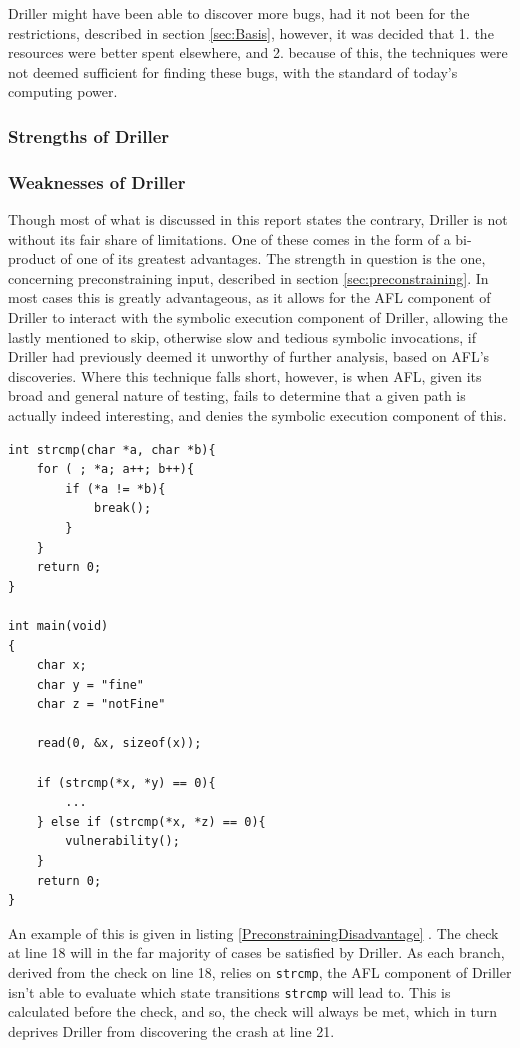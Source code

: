 \documentclass[a4paper]{article}
\newcommand{\ttt}[1]{\texttt{#1}}
\begin{document}
Driller might have been able to discover more bugs, had it not been for the restrictions, described in section \ref{sec:Basis}, however, it was decided that 1. the resources were better spent elsewhere, and 2. because of this, the techniques were not deemed sufficient for finding these bugs, with the standard of today's computing power.
\subsubsection{Strengths of Driller}
\label{sec:DrillerStrengths}

\subsubsection{Weaknesses of Driller}
\label{sec:Driller Weaknesses}
Though most of what is discussed in this report states the contrary, Driller is not without its fair share of limitations. One of these comes in the form of a bi-product of one of its greatest advantages. The strength in question is the one, concerning preconstraining input, described in section \ref{sec:preconstraining}. In most cases this is greatly advantageous, as it allows for the AFL component of Driller to interact with the symbolic execution component of Driller, allowing the lastly mentioned to skip, otherwise slow and tedious symbolic invocations, if Driller had previously deemed it unworthy of further analysis, based on AFL's discoveries. Where this technique falls short, however, is when AFL, given its broad and general nature of testing, fails to determine that a given path is actually indeed interesting, and denies the symbolic execution component of this.
\begin{lstlisting}[caption=An example of preconstraining being a disadvantage,
label=PreconstrainingDisadvantage, captionpos=b]
int strcmp(char *a, char *b){
    for ( ; *a; a++; b++){
        if (*a != *b){
            break();
        }
    }
    return 0;
}

int main(void)
{
    char x;
    char y = "fine"
    char z = "notFine"
    
    read(0, &x, sizeof(x));
    
    if (strcmp(*x, *y) == 0){
        ...
    } else if (strcmp(*x, *z) == 0){
        vulnerability();
    }
    return 0;
}
\end{lstlisting}
An example of this is given in listing \ref{PreconstrainingDisadvantage} \cite[p.14]{Driller}. The check at line 18 will in the far majority of cases be satisfied by Driller. As each branch, derived from the check on line 18, relies on \ttt{strcmp}, the AFL component of Driller isn't able to evaluate which state transitions \ttt{strcmp} will lead to. This is calculated before the check, and so, the check will always be met, which in turn deprives Driller from discovering the crash at line 21.
\end{document}
